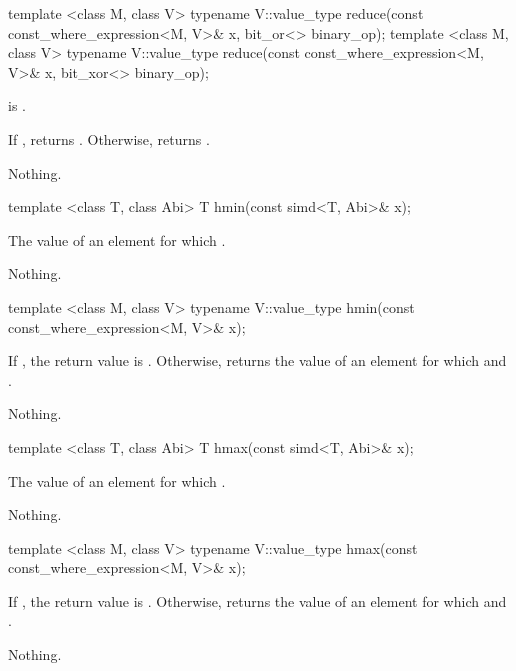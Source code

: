 \begin{itemdecl}
template <class M, class V>
typename V::value_type reduce(const const_where_expression<M, V>& x, bit_or<> binary_op);
template <class M, class V>
typename V::value_type reduce(const const_where_expression<M, V>& x, bit_xor<> binary_op);
\end{itemdecl}
\begin{itemdescr}
  \pnum\requires {} is \true.

  \pnum\returns
  If , returns .
  Otherwise, returns  .

  \pnum\throws Nothing.
\end{itemdescr}

\begin{itemdecl}
template <class T, class Abi> T hmin(const simd<T, Abi>& x);
\end{itemdecl}
\begin{itemdescr}
  \pnum\returns The value of an element  for which  \foralli.

  \pnum\throws Nothing.
\end{itemdescr}

\begin{itemdecl}
template <class M, class V> typename V::value_type hmin(const const_where_expression<M, V>& x);
\end{itemdecl}
\begin{itemdescr}
  \pnum\returns If , the return value is .
  Otherwise, returns the value of an element  for which  and  .

  \pnum\throws Nothing.
\end{itemdescr}

\begin{itemdecl}
template <class T, class Abi> T hmax(const simd<T, Abi>& x);
\end{itemdecl}
\begin{itemdescr}
  \pnum\returns The value of an element  for which  \foralli.

  \pnum\throws Nothing.
\end{itemdescr}

\begin{itemdecl}
template <class M, class V> typename V::value_type hmax(const const_where_expression<M, V>& x);
\end{itemdecl}
\begin{itemdescr}
  \pnum\returns If , the return value is .
  Otherwise, returns the value of an element  for which  and  .

  \pnum\throws Nothing.
\end{itemdescr}


